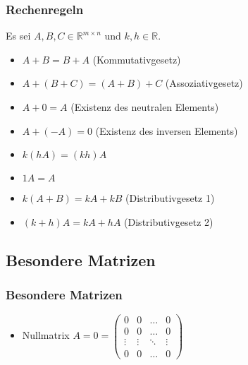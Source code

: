 \begin{frame}
    \frametitle{Rechenregeln}
    Es sei $A, B, C \in \mathbb{R}^{m \times n}$ und $k, h \in \mathbb{R}$.
    \begin{itemize}
        \item $A + B = B + A$ (Kommutativgesetz)
        \item $A + (B + C) = (A + B) + C$ (Assoziativgesetz)
        \item $A + 0 = A$ (Existenz des neutralen Elements)
        \item $A + (-A) = 0$ (Existenz des inversen Elements)
        \item $k(hA) = (kh)A$
        \item $1A = A$
        \item $k(A + B) = kA + kB$ (Distributivgesetz 1)
        \item $(k + h)A = kA + hA$ (Distributivgesetz 2)
    \end{itemize}
\end{frame}

\subsection{Besondere Matrizen}
\begin{frame}
    \frametitle{Besondere Matrizen}
    \begin{itemize}
        \item Nullmatrix $A = 0 = \begin{pmatrix}
                                    0 & 0 & \dots  & 0 \\
                                    0 & 0 & \dots  & 0 \\
                                    \vdots & \vdots & \ddots & \vdots \\
                                    0 & 0 & \dots  & 0
        \end{pmatrix}$
    \end{itemize}
\end{frame}
